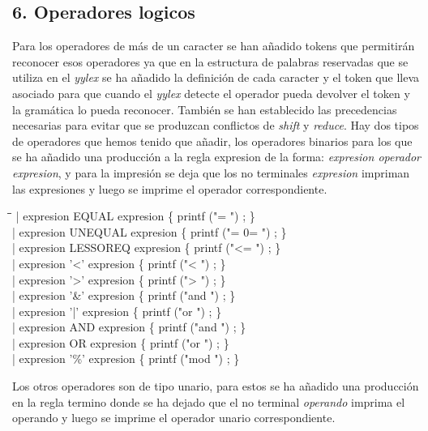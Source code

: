 \documentclass[11pt,spanish]{article}
\begin{document}
        \subsection*{6. Operadores logicos}
        Para los operadores de más de un caracter se han añadido tokens que permitirán reconocer esos operadores ya que en la estructura de palabras reservadas que se utiliza en el \textit {yylex} se ha añadido la definición de cada caracter y el token que lleva asociado para que cuando el \textit {yylex} detecte el operador pueda devolver el token y la gramática lo pueda reconocer. También se han establecido las precedencias necesarias para evitar que se produzcan conflictos de \textit {shift} y \textit {reduce}. Hay dos tipos de operadores que hemos tenido que añadir, los operadores binarios para los que se ha añadido una producción a la regla {\ttfamily expresion} de la forma: \textit {expresion operador expresion}, y para la impresión se deja que los no terminales \textit {expresion} impriman las expresiones y luego se imprime el operador correspondiente.
        \begin{tabbing}
            \hspace*{1cm}\=\hspace*{1cm}\= \hspace*{6cm}\=\kill
            \>| expresion  EQUAL expresion\> \>	    \{ printf  ("= ") ; \}\\
            \>| expresion  UNEQUAL expresion\> \>	    \{ printf  ("= 0= ") ; \}\\
            \>| expresion  LESSOREQ expresion\> \>	\{ printf  ("<= ") ; \}\\
            \>| expresion  '<' expresion\> \>		    \{ printf  ("< ") ; \}\\
            \>| expresion  '>' expresion\> \>	        \{ printf  ("> ") ; \}\\
            \>| expresion  '\&' expresion\> \>		    \{ printf  ("and ") ; \}\\
            \>| expresion  '|' expresion\> \>		    \{ printf  ("or ") ; \}\\
            \>| expresion  AND expresion\> \>	        \{ printf  ("and ") ; \}\\
            \>| expresion  OR expresion\> \>	        \{ printf  ("or ") ; \}\\
            \>| expresion  '\%' expresion\> \>		    \{ printf  ("mod ") ; \}
        \end{tabbing}
        Los otros operadores son de tipo unario, para estos se ha añadido una producción en la regla {\ttfamily termino} donde se ha dejado que el no terminal \textit {operando} imprima el operando y luego se imprime el operador unario correspondiente.
\end{document}
